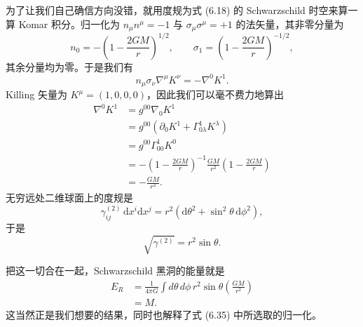 为了让我们自己确信方向没错，就用度规为式 (6.18) 的 Schwarzschild 时空来算一算 Komar 积分。归一化为 $n_{\mu}n^{\mu}=-1$ 与 $\sigma_{\mu}\sigma^{\mu}=+1$ 的法矢量，其非零分量为
\begin{equation*}
n_{0} = -\left(1-\frac{2GM}{r}\right)^{1/2}, \qquad \sigma_{1} = \left(1-\frac{2GM}{r}\right)^{-1/2},
\tag{6.39}
\end{equation*}
其余分量均为零。于是我们有
\begin{equation*}
n_{\mu}\sigma_{\nu}\nabla^{\mu}K^{\nu} = -\nabla^{0}K^{1}.
\tag{6.40}
\end{equation*}
Killing 矢量为 $K^{\mu}=(1,0,0,0)$，因此我们可以毫不费力地算出
\begin{align*}
\nabla^{0}K^{1} &= g^{00}\nabla_{0}K^{1}\\
&= g^{00}\left(\partial_{0}K^{1}+\Gamma^{1}_{0\lambda}K^{\lambda}\right)\\
&= g^{00}\Gamma^{1}_{00}K^{0}\\
&= -\left(1-\frac{2GM}{r}\right)^{-1}\frac{GM}{r^{2}}\left(1-\frac{2GM}{r}\right)\\
&= -\frac{GM}{r^{2}}.
\tag{6.41}
\end{align*}
无穷远处二维球面上的度规是
\begin{equation*}
\gamma^{(2)}_{ij}\,\mathrm{d}x^{i}\mathrm{d}x^{j} = r^{2}\left(\mathrm{d}\theta^{2}+\sin^{2}\theta\,\mathrm{d}\phi^{2}\right),
\tag{6.42}
\end{equation*}
于是
\begin{equation*}
\sqrt{\gamma^{(2)}} = r^{2}\sin\theta.
\tag{6.43}
\end{equation*}

把这一切合在一起，Schwarzschild 黑洞的能量就是
\begin{align*}
E_{R} &= \frac{1}{4\pi G}\int d\theta\, d\phi\, r^{2}\sin\theta\left(\frac{GM}{r^{2}}\right)\\
&= M.
\tag{6.44}
\end{align*}
这当然正是我们想要的结果，同时也解释了式 (6.35) 中所选取的归一化。

